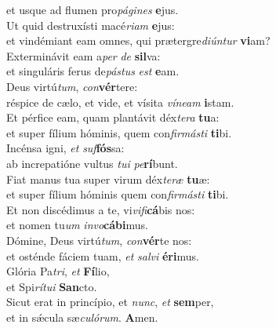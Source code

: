 \evenverse et usque ad flumen pro\textit{pá}\textit{gi}\textit{nes} \textbf{e}jus.\\
\oddverse Ut quid destruxísti macé\textit{ri}\textit{am} \textbf{e}jus:~\*\\
\oddverse et vindémiant eam omnes, qui prætergre\textit{di}\textit{ún}\textit{tur} \textbf{vi}am?\\
\evenverse Exterminávit eam a\textit{per} \textit{de} \textbf{sil}va:~\*\\
\evenverse et singuláris ferus de\textit{pá}\textit{stus} \textit{est} \textbf{e}am.\\
\oddverse Deus virtú\textit{tum}, \textit{con}\textbf{vér}tere:~\*\\
\oddverse réspice de cælo, et vide, et vísita \textit{ví}\textit{ne}\textit{am} \textbf{i}stam.\\
\evenverse Et pérfice eam, quam plantávit déx\textit{te}\textit{ra} \textbf{tu}a:~\*\\
\evenverse et super fílium hóminis, quem con\textit{fir}\textit{má}\textit{sti} \textbf{ti}bi.\\
\oddverse Incénsa igni, \textit{et} \textit{suf}\textbf{fós}sa:~\*\\
\oddverse ab increpatióne vultus \textit{tu}\textit{i} \textit{pe}\textbf{rí}bunt.\\
\evenverse Fiat manus tua super virum déx\textit{te}\textit{ræ} \textbf{tu}æ:~\*\\
\evenverse et super fílium hóminis quem con\textit{fir}\textit{má}\textit{sti} \textbf{ti}bi.\\
\oddverse Et non discédimus a te, vi\textit{vi}\textit{fi}\textbf{cá}bis nos:~\*\\
\oddverse et nomen tu\textit{um} \textit{in}\textit{vo}\textbf{cá}\textbf{bi}mus.\\
\evenverse Dómine, Deus virtú\textit{tum}, \textit{con}\textbf{vér}te nos:~\*\\
\evenverse et osténde fáciem tuam, \textit{et} \textit{sal}\textit{vi} \textbf{é}\textbf{ri}mus.\\
\oddverse Glória Pa\textit{tri}, \textit{et} \textbf{Fí}lio,~\*\\
\oddverse et Spi\textit{rí}\textit{tu}\textit{i} \textbf{San}cto.\\
\evenverse Sicut erat in princípio, et \textit{nunc}, \textit{et} \textbf{sem}per,~\*\\
\evenverse et in sǽcula sæ\textit{cu}\textit{ló}\textit{rum}. \textbf{A}men.\\
